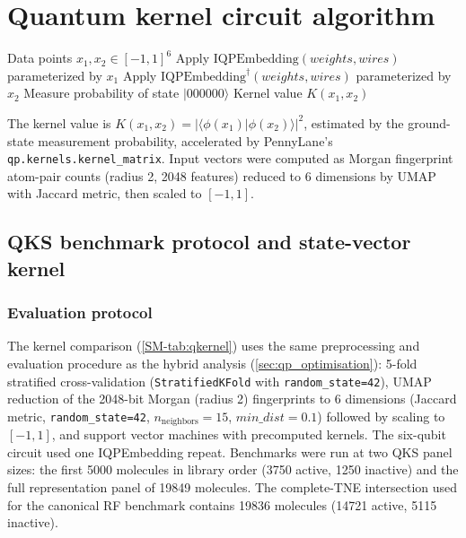 \documentclass[11pt,a4paper]{article}
\begin{document}
\section{Quantum kernel circuit algorithm}
\label{sec:qkernel_algorithm}

\begin{algorithm}[htbp]
\caption{Quantum kernel circuit for 6-qubit state overlap using PennyLane's \texttt{IQPEmbedding} template.}
\label{SM-alg:qkernel}
\begin{algorithmic}[1]
\REQUIRE Data points $x_1, x_2 \in [-1, 1]^6$
\STATE Apply $\mathrm{IQPEmbedding}(weights, wires)$ parameterized by $x_1$
\STATE Apply $\mathrm{IQPEmbedding}^\dagger(weights, wires)$ parameterized by $x_2$
\STATE Measure probability of state $|000000\rangle$
\RETURN Kernel value $K(x_1, x_2)$
\end{algorithmic}
\end{algorithm}

The kernel value is $K(x_1, x_2) = |\langle \phi(x_1) | \phi(x_2) \rangle|^2$, estimated by the ground-state measurement probability, accelerated by PennyLane's \texttt{qp.kernels.kernel\_matrix}. Input vectors were computed as Morgan fingerprint atom-pair counts (radius 2, \num{2048} features) reduced to 6 dimensions by UMAP with Jaccard metric, then scaled to $[-1, 1]$.

\subsection{QKS benchmark protocol and state-vector kernel}
\label{sec:qks_benchmark}

\subsubsection{Evaluation protocol}
The kernel comparison (\cref{SM-tab:qkernel}) uses the same preprocessing and evaluation procedure as the hybrid analysis (\cref{sec:qp_optimisation}): 5-fold stratified cross-validation (\texttt{StratifiedKFold} with \texttt{random\_state=42}), UMAP reduction of the 2048-bit Morgan (radius 2) fingerprints to 6 dimensions (Jaccard metric, \texttt{random\_state=42}, $n_{\text{neighbors}}=15$, $min\_dist=0.1$) followed by scaling to $[-1,1]$, and support vector machines with precomputed kernels. The six-qubit circuit used one IQPEmbedding repeat. Benchmarks were run at two QKS panel sizes: the first \num{5000} molecules in library order (\num{3750} active, \num{1250} inactive) and the full representation panel of \num{19849} molecules. The complete-TNE intersection used for the canonical RF benchmark contains \num{19836} molecules (\num{14721} active, \num{5115} inactive).
\end{document}

